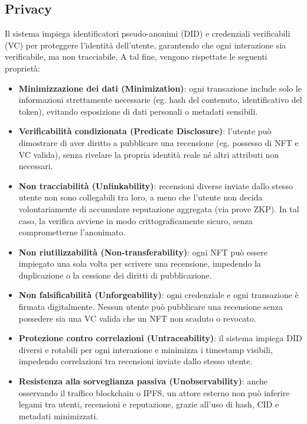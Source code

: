         \subsection{Privacy}
            Il sistema impiega identificatori pseudo-anonimi (DID) e credenziali verificabili (VC) per proteggere l'identità dell'utente, garantendo che ogni interazione sia verificabile, ma non tracciabile.
            A tal fine, vengono rispettate le seguenti proprietà:            
                \begin{itemize}
                    \item \textbf{Minimizzazione dei dati (Minimization)}: ogni transazione include solo le informazioni strettamente necessarie (eg. hash del contenuto, identificativo del token), evitando esposizione di dati personali o metadati sensibili.
                
                    \item \textbf{Verificabilità condizionata (Predicate Disclosure)}: l'utente può dimostrare di aver diritto a pubblicare una recensione (eg. possesso di NFT e VC valida), senza rivelare la propria identità reale né altri attributi non necessari.
                
                    \item \textbf{Non tracciabilità (Unlinkability)}: recensioni diverse inviate dallo stesso utente non sono collegabili tra loro, a meno che l'utente non decida volontariamente di accumulare reputazione aggregata (via prove ZKP). In tal caso, la verifica avviene in modo crittograficamente sicuro, senza comprometterne l'anonimato.
                
                    \item \textbf{Non riutilizzabilità (Non-transferability)}: ogni NFT può essere impiegato una sola volta per scrivere una recensione, impedendo la duplicazione o la cessione dei diritti di pubblicazione.
                
                    \item \textbf{Non falsificabilità (Unforgeability)}: ogni credenziale e ogni transazione è firmata digitalmente. Nessun utente può pubblicare una recensione senza possedere sia una VC valida che un NFT non scaduto o revocato.
                
                    \item \textbf{Protezione contro correlazioni (Untraceability)}: il sistema impiega DID diversi e rotabili per ogni interazione e minimizza i timestamp visibili, impedendo correlazioni tra recensioni inviate dallo stesso utente.
                
                    \item \textbf{Resistenza alla sorveglianza passiva (Unobservability)}: anche osservando il traffico blockchain o IPFS, un attore esterno non può inferire legami tra utenti, recensioni e reputazione, grazie all'uso di hash, CID e metadati minimizzati.
                \end{itemize}


